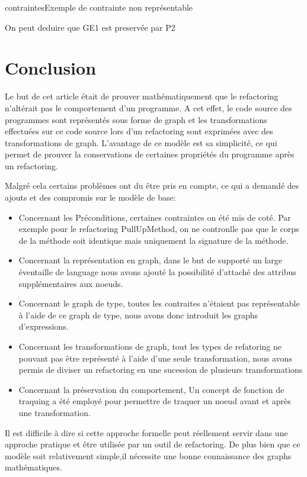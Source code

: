 \documentclass[a4paper, 12pt]{article}
\begin{document}
\begin{figu}{contraintes}{Exemple de contrainte non représentable}
{\begin{enumerate}
    On peut deduire que GE1 est preservée par P2
  \end{enumerate}

  \section{Conclusion}

  Le but de cet article était de prouver mathématiquement que le refactoring n'altérait pas le comportement d'un programme. A cet effet, le code source des programmes sont représentés sous forme de graph
  et les transformations effectuées sur ce code source lors d'un refactoring sont exprimées avec des transformations de graph.
  L'avantage de ce modèle est sa simplicité, ce qui permet de prouver la conservations de certaines propriétés du programme après un refactoring.

  Malgré cela certains problèmes ont du être pris en compte, ce qui a demandé des ajouts et des compromis sur le modèle de base:

  \begin{itemize}
    \item Concernant les Préconditions, certaines contraintes on été mis de coté. Par exemple pour le refactoring PullUpMethod, on ne contronlle pas que le corps de la méthode soit identique mais uniquement la signature de la méthode.

    \item Concernant la représentation en graph, dans le but de supporté un large éventaille de language nous avons ajouté la possibilité d'attaché des attribus supplémentaires aux noeuds.

    \item Concernant le graph de type, toutes les contraites n'étaient pas représentable à l'aide de ce graph de type, nous avons donc introduit les graphs d'expressions.

    \item Concernant les transformations de graph, tout les types de refatoring ne pouvant pas être représenté à l'aide d'une seule transformation, nous avons permis de diviser un refactoring en une sucession de plusieurs transformations

    \item Concernant la préservation du comportement, Un concept de fonction de traquing a été employé pour permettre de traquer un noeud avant et après une transformation.
  \end{itemize}

  Il est difficile à dire si cette approche formelle peut réellement servir dans une approche pratique et être utilisée par un outil de refactoring.
  De plus bien que ce modèle soit relativement simple,il nécessite une bonne connaissance des graphs mathématiques.

}
\end{figu}
\end{document}
